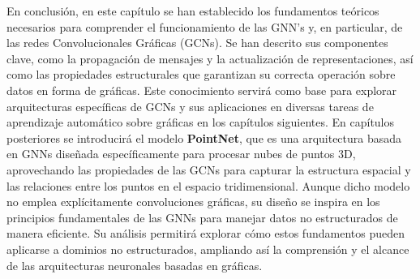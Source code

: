 En conclusión, en este capítulo se han establecido los fundamentos teóricos necesarios para comprender el funcionamiento de las GNN's y, en particular, de las redes Convolucionales Gráficas (GCNs).
Se han descrito sus componentes clave, como la propagación de mensajes y la actualización de representaciones, así como las propiedades estructurales que garantizan su correcta operación sobre datos en forma de gráficas.
Este conocimiento servirá como base para explorar arquitecturas específicas de GCNs y sus aplicaciones en diversas tareas de aprendizaje automático sobre gráficas en los capítulos siguientes.
En capítulos posteriores se introducirá el modelo \textbf{PointNet}, que es una arquitectura basada en GNNs diseñada específicamente para procesar nubes de puntos 3D, aprovechando las propiedades de las GCNs para capturar la estructura espacial y las relaciones entre los puntos en el espacio tridimensional. Aunque dicho modelo no emplea explícitamente convoluciones gráficas, su diseño se inspira en los principios fundamentales de las GNNs para manejar datos no estructurados de manera eficiente.
Su análisis permitirá explorar cómo estos fundamentos pueden aplicarse a dominios no estructurados, ampliando así la comprensión y el alcance de las arquitecturas neuronales basadas en gráficas.